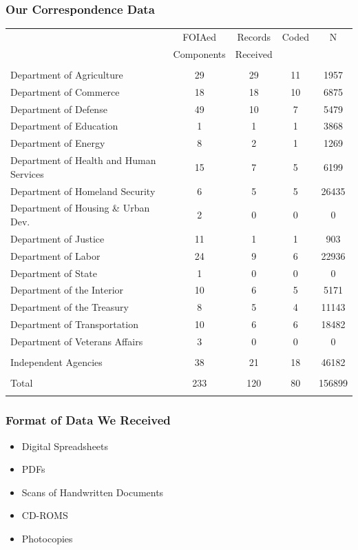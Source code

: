 \documentclass[13pt]{beamer}
\begin{document}
\begin{frame}
\frametitle{Our Correspondence Data}
\scriptsize
\begin{table}[!htbp] \centering 
  \label{} 
\begin{tabular}{@{\extracolsep{5pt}} lcccc} 
 & FOIAed  & Records & Coded & N \\ 
 &Components&Received&&\\
\hline \\[-1.8ex] 
Department of Agriculture & 29 & 29 & 11 & 1957 \\ 
Department of Commerce & 18 & 18 & 10 & 6875 \\ 
Department of Defense & 49 & 10 & 7 & 5479 \\ 
Department of Education & 1 & 1 & 1 & 3868 \\ 
Department of Energy & 8 & 2 & 1 & 1269 \\ 
Department of Health and Human Services & 15 & 7 & 5 & 6199 \\ 
Department of Homeland Security & 6 & 5 & 5 & 26435 \\ 
Department of Housing \& Urban Dev. & 2 & 0 & 0 & 0 \\ 
Department of Justice & 11 & 1 & 1 & 903 \\ 
Department of Labor & 24 & 9 & 6 & 22936 \\ 
Department of State & 1 & 0 & 0 & 0 \\ 
Department of the Interior & 10 & 6 & 5 & 5171 \\ 
Department of the Treasury & 8 & 5 & 4 & 11143 \\ 
Department of Transportation & 10 & 6 & 6 & 18482 \\ 
Department of Veterans Affairs & 3 & 0 & 0 & 0 \\ 
\hline \\[-1.8ex] 
Independent Agencies & 38 & 21 & 18 & 46182 \\ 
\hline \\[-1.8ex] 
Total & 233 & 120 & 80 & 156899 \\ 
\hline \\[-1.8ex] 
\end{tabular} 
\end{table} 

\end{frame}
\begin{frame}
\frametitle{Format of Data We Received}
\begin{itemize}
\item Digital Spreadsheets
\item PDFs
\item Scans of Handwritten Documents
\item CD-ROMS
\item Photocopies
\end{itemize}
\end{frame}
\end{document}
